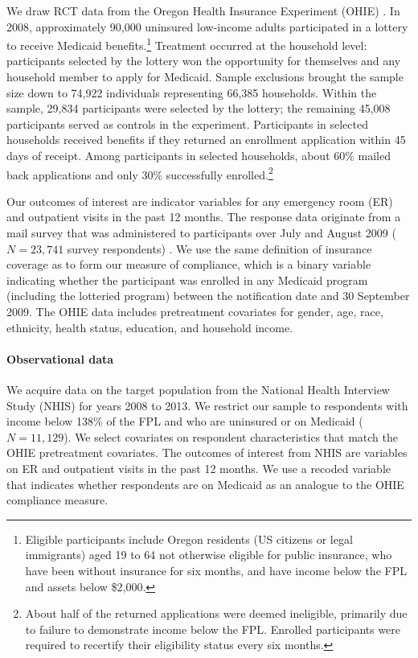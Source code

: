 \documentclass[12pt]{article}
\begin{document}
We draw RCT data from the Oregon Health Insurance Experiment (OHIE) \citep{finkelstein2012,baicker2013,baicker2014,Taubman}.  In 2008, approximately 90,000 uninsured low-income adults participated in a lottery to receive Medicaid benefits.\footnote{Eligible participants include Oregon residents (US citizens or legal immigrants) aged 19 to 64 not otherwise eligible for public insurance, who have been without insurance for six months, and have income below the FPL and assets below \$2,000.} Treatment occurred at the household level: participants selected by the lottery won the opportunity for themselves and any household member to apply for Medicaid. Sample exclusions brought the sample size down to 74,922 individuals representing 66,385 households.  Within the sample, 29,834 participants were selected by the lottery; the remaining 45,008 participants served as controls in the experiment.  Participants in selected households received benefits if they returned an enrollment application within 45 days of receipt. Among participants in selected households, about 60\% mailed back applications and only 30\% successfully enrolled.\footnote{About half of the returned applications were deemed ineligible, primarily due to failure to demonstrate income below the FPL. Enrolled participants were required to recertify their eligibility status every six months.}  

Our outcomes of interest are indicator variables for any emergency room (ER) and outpatient visits in the past 12 months. The response data originate from a mail survey that was administered to participants over July and August 2009 ($N = 23,741$ survey respondents) \cite{finkelstein2012}. We use the same definition of insurance coverage as \citet{finkelstein2012} to form our measure of compliance, which is a binary variable indicating whether the participant was enrolled in any Medicaid program (including the lotteried program) between the notification date and 30 September 2009. The OHIE data includes pretreatment covariates for gender, age, race, ethnicity, health status, education, and household income.

\paragraph{Observational data} 

We acquire data on the target population from the National Health Interview Study (NHIS) \cite{NHIS} for years 2008 to 2013.  We restrict our sample to respondents with income below 138\% of the FPL and who are uninsured or on Medicaid ($N=11,129$). We select covariates on respondent characteristics that match the OHIE pretreatment covariates. The outcomes of interest from NHIS are variables on ER and outpatient visits in the past 12 months. We use a recoded variable that indicates whether respondents are on Medicaid as an analogue to the OHIE compliance measure.
\end{document}
